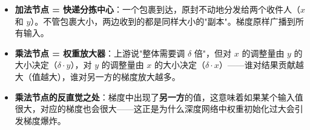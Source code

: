\documentclass[a4paper,11pt]{ctexart}
\begin{document}
\begin{metaphorbox}
    \begin{itemize}
        \item \textbf{加法节点 = 快递分拣中心}：一个包裹到达，原封不动地分发给两个收件人（$x$ 和 $y$）。不管包裹大小，两边收到的都是同样大小的"副本"。梯度原样广播到所有输入。
        \item \textbf{乘法节点 = 权重放大器}：上游说"整体需要调 $\delta$ 倍"，但对 $x$ 的调整量由 $y$ 的大小决定（$\delta \cdot y$），对 $y$ 的调整量由 $x$ 的大小决定（$\delta \cdot x$）——谁对结果贡献越大（值越大），谁对另一方的梯度放大越多。
        \item \textbf{乘法节点的反直觉之处}：梯度中出现了\textbf{另一方}的值，这意味着如果某个输入值很大，对应的梯度也会很大——这正是为什么深度网络中权重初始化过大会引发梯度爆炸。
    \end{itemize}
\end{metaphorbox}
\end{document}
